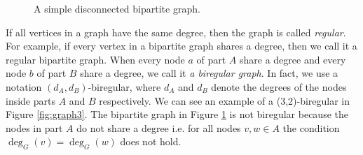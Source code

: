 \begin{figure}[H]
\centering
\caption{A simple disconnected bipartite graph.\label{fig:graph2}}
\end{figure}

If all vertices in a graph have the same degree, then the graph is called \emph{regular}.
For example, if every vertex in a bipartite graph shares a degree, then we call it a regular bipartite graph. When every node $a$ of part $A$ share a degree and every node $b$ of part $B$ share a degree, we call it \emph{a biregular graph}.
In fact, we use a notation $(d_A,d_B)$-biregular, where $d_A$ and $d_B$ denote the degrees of the nodes inside parts $A$ and $B$ respectively.
We can see an example of a (3,2)-biregular in Figure \ref{fig:graph3}.
The bipartite graph in Figure \ref{fig:graph2} is not biregular because the nodes in part $A$ do not share a degree i.e. for all nodes $v, w \in A$ the condition $\deg_G(v) = \deg_G(w)$ does not hold.

